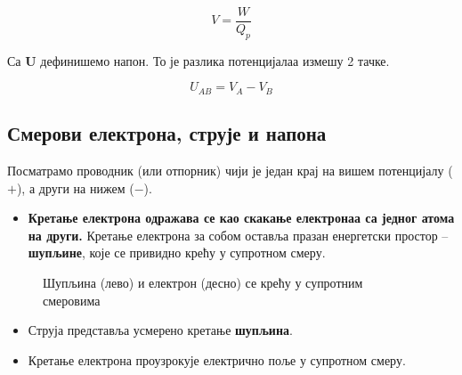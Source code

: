 \documentclass{article}
\begin{document}
\begin{equation}
    V = \frac{W}{Q_p}
\end{equation}

\begin{center}
\end{center}

Са \textbf{U} дефинишемо напон. То је разлика потенцијалаа измешу 2 тачке.

\begin{equation}
    U_{AB} = V_A - V_B
\end{equation}

\subsection{Смерови електрона, струје и напона}

Посматрамо проводник (или отпорник) чији је један крај на вишем потенцијалу ($+$), а други на нижем ($-$).

\begin{itemize}
    \item \textbf{Кретање електрона одражава се као скакање електронаа са једног атома на други.}
    Кретање електрона за собом оставља празан енергетски простор -- \textbf{шупљине}, које се привидно крећу у супротном смеру.
\end{itemize}

\begin{figure}[H]
    \centering
    \caption{Шупљина (лево) и електрон (десно) се крећу у супротним смеровима}
    \label{fig:supljina}
\end{figure}

\begin{itemize}
    \item Струја представља усмерено кретање \textbf{шупљина}.
\end{itemize}

\begin{itemize}
    \item Кретање електрона проузрокује електрично поље у супротном смеру.
\end{itemize}
\end{document}
